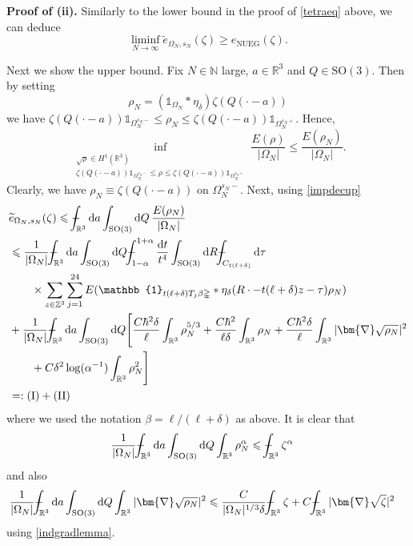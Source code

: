 \documentclass[final,onefignum,onetabnum,reqno]{amsart}
\theoremstyle{remark}
\renewcommand{\le}{\leqslant}
\renewcommand{\ge}{\geqslant}
\newcommand{\wt}[1]{\widetilde{#1}}
\newcommand{\RR}{\mathbb{R}}
\newcommand{\ZZ}{\mathbb{Z}}
\newcommand{\NN}{\mathbb{N}}
\newcommand{\SO}{\mathrm{SO}}
\newcommand{\NUEG}{\mathrm{NUEG}} %
\newcommand{\iden}{\mathbb{1}} %
\newcommand{\grad}{\bm{\nabla}} %
\newcommand{\tetra}{\mathbb{\Delta}} %
\newcommand{\dd}{\mathrm{d}} %
\def\Xint#1{\mathchoice
{\XXint\displaystyle\textstyle{#1}}%
{\XXint\textstyle\scriptstyle{#1}}%
{\XXint\scriptstyle\scriptscriptstyle{#1}}%
{\XXint\scriptscriptstyle\scriptscriptstyle{#1}}%
\!\int}
\def\XXint#1#2#3{{\setbox0=\hbox{$#1{#2#3}{\int}$ }
\vcenter{\hbox{$#2#3$ }}\kern-.6\wd0}}
\def\dashint{\Xint-}
\begin{document}
\vspace{.3em}
\noindent\textbf{Proof of (ii).} Similarly to the lower bound in the proof of \cref{tetraeq} above, we can deduce 
$$
\liminf_{N\to\infty} \wt{e}_{\Omega_N,s_N}(\zeta)\ge e_\NUEG(\zeta).
$$

Next we show the upper bound. Fix $N\in\NN$ large, $a\in\RR^3$ and $Q\in\SO(3)$.
Then by setting 
$$
\rho_N=(\iden_{\Omega_N}*\eta_\delta)\zeta(Q(\cdot-a))
$$
we have
$\zeta(Q(\cdot-a))\iden_{\Omega_N^{s_N-}}\le \rho_N \le \zeta(Q(\cdot-a))\iden_{\Omega_N^{s_N+}}$. Hence,
$$
\inf_{\substack{\sqrt{\rho}\in H^1(\RR^3)\\ \zeta(Q(\cdot-a))\iden_{\Omega_N^{s_N-}}\le \rho \le \zeta(Q(\cdot-a))\iden_{\Omega_N^{s_N+}} }} \frac{E(\rho)}{|\Omega_N|} \le \frac{E(\rho_N)}{|\Omega_N|}.
$$
Clearly, we have $\rho_N\equiv \zeta(Q(\cdot-a))$ on $\Omega_N^{s_N-}$.
Next, using \cref{impdecup}
\begin{align*}
&\wt{e}_{\Omega_N,s_N}(\zeta)\le \dashint_{\RR^3}\dd a\int_{\SO(3)}\dd Q\, \frac{E(\rho_N)}{|\Omega_N|} \\
&\le \frac{1}{|\Omega_N|}\dashint_{\RR^3}\dd a\int_{\SO(3)}\dd Q\dashint_{1-\alpha}^{1+\alpha}\frac{\dd t}{t^4} \int_{\SO(3)}\dd R \dashint_{C_{t(\ell+\delta)}}\dd\tau\\
&\quad\quad\times \sum_{z\in\ZZ^3}  \sum_{j=1}^{24} E(\iden_{t(\ell+\delta) T_j\beta\tetra} * \eta_\delta(R\cdot - t(\ell+\delta) z - \tau)\rho_N)\\
&+\frac{1}{|\Omega_N|} \dashint_{\RR^3}\dd a\int_{\SO(3)}\dd Q \Biggl[ \frac{C\hbar^2\delta}{\ell}\int_{\RR^3}\rho_N^{5/3} +  \frac{C\hbar^2}{\ell\delta} \int_{\RR^3} \rho_N + \frac{C\hbar^2\delta}{\ell}\int_{\RR^3} |\grad\sqrt{\rho_N}|^2\\
&\quad\quad+C\delta^2\log(\alpha^{-1})\int_{\RR^3} \rho_N^2 \Biggr]\\
&=: \mathrm{(I)} + \mathrm{(II)}
\end{align*}
where we used the notation $\beta=\ell/(\ell+\delta)$ as above. 
It is clear that
\begin{align*}
\frac{1}{|\Omega_N|}\dashint_{\RR^3}\dd a\int_{\SO(3)}\dd Q\int_{\RR^3}\rho_N^{\alpha}&\le \dashint_{\RR^3} \zeta^\alpha
\end{align*}
and also
\begin{align*}
&\frac{1}{|\Omega_N|}\dashint_{\RR^3}\dd a\int_{\SO(3)}\dd Q\int_{\RR^3}|\grad\sqrt{\rho_N}|^2
\le \frac{C}{|\Omega_N|^{1/3}\delta}\dashint_{\RR^3}\zeta + C \dashint_{\RR^3} |\grad\sqrt{\zeta}|^2
\end{align*}
using \cref{indgradlemma}. 
\end{document}
